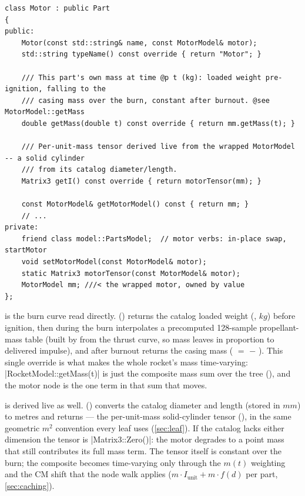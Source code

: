 \begin{listing}[htbp]
\begin{verbatim}
class Motor : public Part
{
public:
    Motor(const std::string& name, const MotorModel& motor);
    std::string typeName() const override { return "Motor"; }

    /// This part's own mass at time @p t (kg): loaded weight pre-ignition, falling to the
    /// casing mass over the burn, constant after burnout. @see MotorModel::getMass
    double getMass(double t) const override { return mm.getMass(t); }

    /// Per-unit-mass tensor derived live from the wrapped MotorModel -- a solid cylinder
    /// from its catalog diameter/length.
    Matrix3 getI() const override { return motorTensor(mm); }

    const MotorModel& getMotorModel() const { return mm; }
    // ...
private:
    friend class model::PartsModel;  // motor verbs: in-place swap, startMotor
    void setMotorModel(const MotorModel& motor);
    static Matrix3 motorTensor(const MotorModel& motor);
    MotorModel mm; ///< the wrapped motor, owned by value
};
\end{verbatim}
\caption{The  leaf (, elided). The public surface is
read-only; the mutation surface is private and reachable only through the
 friend seam.}\label{lst:motor-leaf}
\end{listing}

 is the burn curve read directly. 
() returns the catalog loaded weight
(, $\unit{kg}$) before ignition, then during the burn interpolates a
precomputed 128-sample propellant-mass table (built by  from the thrust
curve, so mass leaves in proportion to delivered impulse), and after burnout returns the casing
mass ( $=$  $-$ ). This single override is what
makes the whole rocket's mass time-varying: \cppinline|RocketModel::getMass(t)| is just the
composite mass sum over the tree (), and the motor node is the
one term in that sum that moves.

 is derived live as well.  ()
converts the catalog diameter and length (stored in $\unit{mm}$) to metres and returns
 --- the per-unit-mass solid-cylinder tensor
(), in the same geometric $\unit{m^2}$ convention every leaf
uses (\cref{sec:leaf}). If the catalog lacks either dimension the tensor is
\cppinline|Matrix3::Zero()|: the motor degrades to a point mass that still contributes its full
mass term. The tensor itself is constant over the burn; the composite becomes time-varying only
through the $m(t)$ weighting and the CM shift that the node walk applies
($m \cdot I_{\mathrm{unit}} + m \cdot f(d)$ per part, \cref{sec:caching}).

